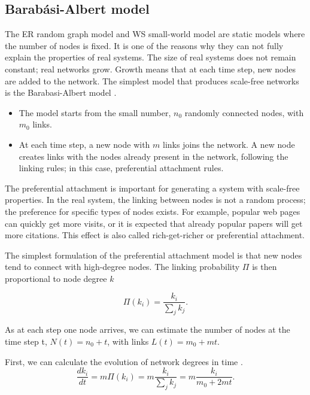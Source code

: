 \subsection{Barab\' {a}si-Albert model}

The ER random graph model and WS small-world model are static models where the number of nodes is fixed. It is one of the reasons why they can not fully explain the properties of real systems. The size of real systems does not remain constant; real networks grow. Growth means that at each time step, new nodes are added to the network. The simplest model that produces scale-free networks is the Barabasi-Albert model \cite{barabasi1999}.

\begin{itemize}
	\item The model starts from the small number, $n_0$ randomly connected nodes, with $m_0$ links.
	\item At each time step, a new node with $m$ links joins the network. A new node creates links with the nodes already present in the network, following the linking rules; in this case, preferential attachment rules. 
\end{itemize}

The preferential attachment is important for generating a system with scale-free properties. In the real system, the linking between nodes is not a random process; the preference for specific types of nodes exists. For example, popular web pages can quickly get more visits, or it is expected that already popular papers will get more citations. This effect is also called rich-get-richer or preferential attachment.

The simplest formulation of the preferential attachment model is that new nodes tend to connect with high-degree nodes. The linking probability $\Pi$ is then proportional to node degree $k$ \cite{albert2002statistical} 

\begin{equation}
\Pi(k_i) = \frac{k_i}{\sum_jk_j}.
\end{equation} 

As at each step one node arrives, we can estimate the number of nodes at the time step t, $N(t) = n_0+t$, with links $L(t) =m_0+ mt$. 

First, we can calculate the evolution of network degrees in time \cite{albert2002statistical}.
\begin{equation}
\frac{dk_i}{dt} = m\Pi(k_i) = m\frac{k_i}{\sum_jk_j} = m\frac{k_i}{m_0 + 2mt}.
\end{equation}

